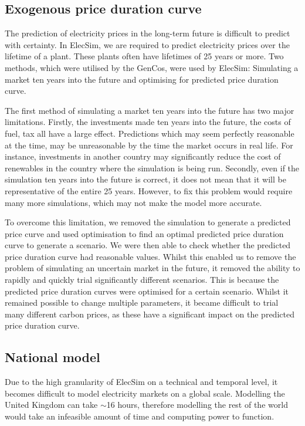 \subsection*{Exogenous price duration curve}

The prediction of electricity prices in the long-term future is difficult to predict with certainty. In ElecSim, we are required to predict electricity prices over the lifetime of a plant. These plants often have lifetimes of 25 years or more. Two methods, which were utilised by the GenCos, were used by ElecSim: Simulating a market ten years into the future and optimising for predicted price duration curve.

The first method of simulating a market ten years into the future has two major limitations. Firstly, the investments made ten years into the future, the costs of fuel, tax all have a large effect. Predictions which may seem perfectly reasonable at the time, may be unreasonable by the time the market occurs in real life. For instance, investments in another country may significantly reduce the cost of renewables in the country where the simulation is being run. Secondly, even if the simulation ten years into the future is correct, it does not mean that it will be representative of the entire 25 years. However, to fix this problem would require many more simulations, which may not make the model more accurate.

To overcome this limitation, we removed the simulation to generate a predicted price curve and used optimisation to find an optimal predicted price duration curve to generate a scenario. We were then able to check whether the predicted price duration curve had reasonable values. Whilst this enabled us to remove the problem of simulating an uncertain market in the future, it removed the ability to rapidly and quickly trial significantly different scenarios. This is because the predicted price duration curves were optimised for a certain scenario. Whilst it remained possible to change multiple parameters, it became difficult to trial many different carbon prices, as these have a significant impact on the predicted price duration curve.


\subsection*{National model}

Due to the high granularity of ElecSim on a technical and temporal level, it becomes difficult to model electricity markets on a global scale. Modelling the United Kingdom can take ${\sim}$16 hours, therefore modelling the rest of the world would take an infeasible amount of time and computing power to function. 


